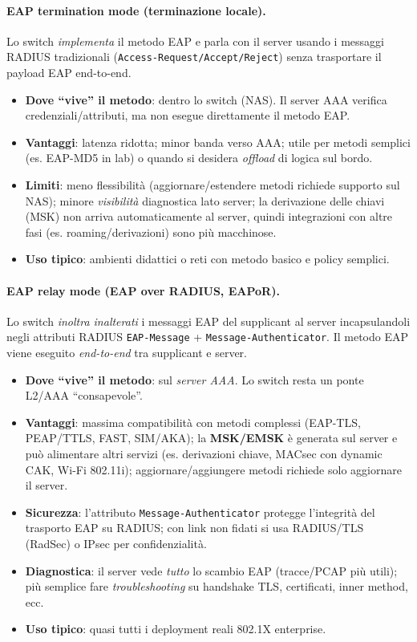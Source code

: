 \paragraph{ EAP termination mode (terminazione locale).}
Lo switch \emph{implementa} il metodo EAP e parla con il server usando i messaggi RADIUS tradizionali
(\texttt{Access-Request/Accept/Reject}) senza trasportare il payload EAP end-to-end.
\begin{itemize}
  \item \textbf{Dove “vive” il metodo}: dentro lo switch (NAS). Il server AAA verifica credenziali/attributi,
        ma non esegue direttamente il metodo EAP.
  \item \textbf{Vantaggi}: latenza ridotta; minor banda verso AAA; utile per metodi semplici (es. EAP-MD5 in lab) o
        quando si desidera \emph{offload} di logica sul bordo.
  \item \textbf{Limiti}: meno flessibilità (aggiornare/estendere metodi richiede supporto sul NAS);
        minore \emph{visibilità} diagnostica lato server; la derivazione delle chiavi (MSK) non arriva
        automaticamente al server, quindi integrazioni con altre fasi (es. roaming/derivazioni) sono più
        macchinose.
  \item \textbf{Uso tipico}: ambienti didattici o reti con metodo basico e policy semplici.
\end{itemize}

\paragraph{ EAP relay mode (EAP over RADIUS, EAPoR).}
Lo switch \emph{inoltra inalterati} i messaggi EAP del supplicant al server incapsulandoli negli attributi
RADIUS \texttt{EAP-Message} + \texttt{Message-Authenticator}. Il metodo EAP viene eseguito \emph{end-to-end}
tra supplicant e server.
\begin{itemize}
  \item \textbf{Dove “vive” il metodo}: sul \emph{server AAA}. Lo switch resta un ponte L2/AAA “consapevole”.
  \item \textbf{Vantaggi}: massima compatibilità con metodi complessi (EAP-TLS, PEAP/TTLS, FAST, SIM/AKA);
        la \textbf{MSK/EMSK} è generata sul server e può alimentare altri servizi (es. derivazioni chiave, MACsec
        con dynamic CAK, Wi-Fi 802.11i); aggiornare/aggiungere metodi richiede solo aggiornare il server.
  \item \textbf{Sicurezza}: l’attributo \texttt{Message-Authenticator} protegge l’integrità del trasporto EAP
        su RADIUS; con link non fidati si usa RADIUS/TLS (RadSec) o IPsec per confidenzialità.
  \item \textbf{Diagnostica}: il server vede \emph{tutto} lo scambio EAP (tracce/PCAP più utili); più semplice
        fare \emph{troubleshooting} su handshake TLS, certificati, inner method, ecc.
  \item \textbf{Uso tipico}: quasi tutti i deployment reali 802.1X enterprise.
\end{itemize}




